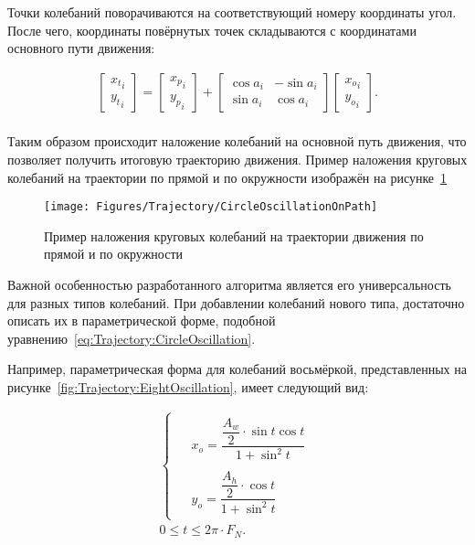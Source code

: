 Точки колебаний поворачиваются на соответствующий номеру координаты угол.
После чего, координаты повёрнутых точек складываются с координатами основного пути движения:

\begin{gather*}
    \begin{bmatrix}
        {x_t}_i \\
        {y_t}_i
    \end{bmatrix} =
    \begin{bmatrix}
        {x_p}_i \\
        {y_p}_i
    \end{bmatrix} +
    \begin{bmatrix}
        \cos a_i & - \sin a_i \\
        \sin a_i & \cos a_i
    \end{bmatrix}
    \begin{bmatrix}
        {x_o}_i \\
        {y_o}_i
    \end{bmatrix}.
\end{gather*} \\

Таким образом происходит наложение колебаний на основной путь движения, что позволяет получить итоговую траекторию движения.
Пример наложения круговых колебаний на траектории по прямой и по окружности изображён на рисунке~\ref{fig:Trajectory:CircleOscillationOnPath}

\begin{figure}[H]
    \centering
    \vspace{14pt}
    \texttt{[image: Figures/Trajectory/CircleOscillationOnPath]}
    \caption{Пример наложения круговых колебаний на траектории движения по прямой и по окружности}
    \label{fig:Trajectory:CircleOscillationOnPath}
\end{figure}

Важной особенностью разработанного алгоритма является его универсальность для разных типов колебаний.
При добавлении колебаний нового типа, достаточно описать их в параметрической форме, подобной уравнению~\ref{eq:Trajectory:CircleOscillation}.

Например, параметрическая форма для колебаний восьмёркой, представленных на рисунке~\ref{fig:Trajectory:EightOscillation}, имеет следующий вид:

\begin{gather*}
    \begin{cases}
        \begin{aligned}
            &x_o = \dfrac{\dfrac{A_w}{2} \cdot \sin t \cos t}{1 + \sin^2 t} \\
            \\
            &y_o = \dfrac{\dfrac{A_h}{2} \cdot \cos t}{1 + \sin^2 t}
        \end{aligned}
    \end{cases} \\
    0 \leq t \leq 2 \pi \cdot F_N.
\end{gather*}

